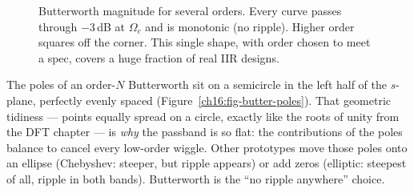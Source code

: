 \begin{figure}[H]
\centering
{}
\caption{Butterworth magnitude for several orders. Every curve passes through
$-3$\,dB at $\Omega_c$ and is monotonic (no ripple). Higher order squares off the
corner. This single shape, with order chosen to meet a spec, covers a huge
fraction of real IIR designs.}
\label{ch16:fig-butter}
\end{figure}

\begin{intuitionbox}
The poles of an order-$N$ Butterworth sit on a semicircle in the left half of the
$s$-plane, perfectly evenly spaced (Figure~\ref{ch16:fig-butter-poles}). That geometric tidiness --- points equally
spread on a circle, exactly like the roots of unity from the DFT chapter --- is
\emph{why} the passband is so flat: the contributions of the poles balance to
cancel every low-order wiggle. Other prototypes move those poles onto an ellipse
(Chebyshev: steeper, but ripple appears) or add zeros (elliptic: steepest of all,
ripple in both bands). Butterworth is the ``no ripple anywhere'' choice.
\end{intuitionbox}

